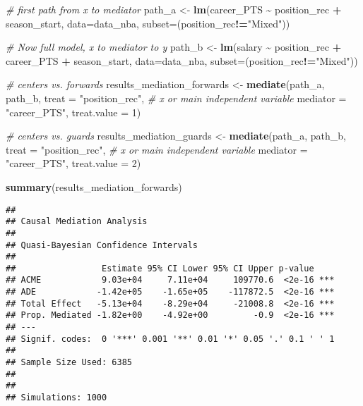 \documentclass[
]{book}
\newenvironment{Shaded}{\begin{snugshade}}{\end{snugshade}}
\newcommand{\AttributeTok}[1]{\textcolor[rgb]{0.13,0.29,0.53}{#1}}
\newcommand{\CommentTok}[1]{\textcolor[rgb]{0.56,0.35,0.01}{\textit{#1}}}
\newcommand{\DecValTok}[1]{\textcolor[rgb]{0.00,0.00,0.81}{#1}}
\newcommand{\FunctionTok}[1]{\textcolor[rgb]{0.13,0.29,0.53}{\textbf{#1}}}
\newcommand{\NormalTok}[1]{#1}
\newcommand{\OtherTok}[1]{\textcolor[rgb]{0.56,0.35,0.01}{#1}}
\newcommand{\SpecialCharTok}[1]{\textcolor[rgb]{0.81,0.36,0.00}{\textbf{#1}}}
\newcommand{\StringTok}[1]{\textcolor[rgb]{0.31,0.60,0.02}{#1}}
\begin{document}
\begin{Shaded}
\begin{Highlighting}[]
\CommentTok{\# first path from x to mediator}
\NormalTok{path\_a }\OtherTok{\textless{}{-}} \FunctionTok{lm}\NormalTok{(career\_PTS }\SpecialCharTok{\textasciitilde{}}\NormalTok{ position\_rec }\SpecialCharTok{+}\NormalTok{ season\_start, }\AttributeTok{data=}\NormalTok{data\_nba, }\AttributeTok{subset=}\NormalTok{(position\_rec}\SpecialCharTok{!=}\StringTok{"Mixed"}\NormalTok{))}

\CommentTok{\# Now full model, x to mediator to y}
\NormalTok{path\_b }\OtherTok{\textless{}{-}} \FunctionTok{lm}\NormalTok{(salary }\SpecialCharTok{\textasciitilde{}}\NormalTok{ position\_rec }\SpecialCharTok{+}\NormalTok{ career\_PTS }\SpecialCharTok{+}\NormalTok{ season\_start, }\AttributeTok{data=}\NormalTok{data\_nba, }\AttributeTok{subset=}\NormalTok{(position\_rec}\SpecialCharTok{!=}\StringTok{"Mixed"}\NormalTok{))}

\CommentTok{\# centers vs. forwards}
\NormalTok{results\_mediation\_forwards }\OtherTok{\textless{}{-}} \FunctionTok{mediate}\NormalTok{(path\_a, path\_b,}
                             \AttributeTok{treat =} \StringTok{"position\_rec"}\NormalTok{, }\CommentTok{\# x or main independent variable}
                             \AttributeTok{mediator =} \StringTok{"career\_PTS"}\NormalTok{,}
                             \AttributeTok{treat.value =} \DecValTok{1}\NormalTok{)}

\CommentTok{\# centers vs. guards}
\NormalTok{results\_mediation\_guards }\OtherTok{\textless{}{-}} \FunctionTok{mediate}\NormalTok{(path\_a, path\_b,}
                             \AttributeTok{treat =} \StringTok{"position\_rec"}\NormalTok{, }\CommentTok{\# x or main independent variable}
                             \AttributeTok{mediator =} \StringTok{"career\_PTS"}\NormalTok{,}
                             \AttributeTok{treat.value =} \DecValTok{2}\NormalTok{)}

\FunctionTok{summary}\NormalTok{(results\_mediation\_forwards)}
\end{Highlighting}
\end{Shaded}

\begin{verbatim}
## 
## Causal Mediation Analysis 
## 
## Quasi-Bayesian Confidence Intervals
## 
##                 Estimate 95% CI Lower 95% CI Upper p-value    
## ACME            9.03e+04     7.11e+04     109770.6  <2e-16 ***
## ADE            -1.42e+05    -1.65e+05    -117872.5  <2e-16 ***
## Total Effect   -5.13e+04    -8.29e+04     -21008.8  <2e-16 ***
## Prop. Mediated -1.82e+00    -4.92e+00         -0.9  <2e-16 ***
## ---
## Signif. codes:  0 '***' 0.001 '**' 0.01 '*' 0.05 '.' 0.1 ' ' 1
## 
## Sample Size Used: 6385 
## 
## 
## Simulations: 1000
\end{verbatim}
\end{document}
